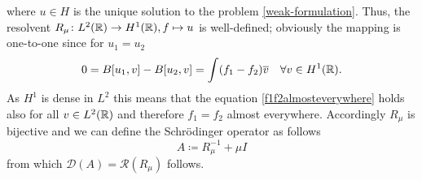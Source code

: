 where $u \in H$ is the unique solution to the problem \eqref{weak-formulation}. Thus, the resolvent $R_{\mu} \colon L^{2}(\mathbb{R}) \rightarrow H^{1}(\mathbb{R}), f \mapsto u$ is well-defined; obviously the mapping is one-to-one since for $u_{1} = u_{2}$
	\begin{equation}
		0 = B[u_{1}, v] - B[u_{2}, v]= \int (f_{1} - f_{2}) \overline{v} \quad \forall v \in H^{1}(\mathbb{R}). \label{f1f2almosteverywhere}
	\end{equation} 
As $H^{1}$ is dense in $L^{2}$ this means that the equation \eqref{f1f2almosteverywhere} holds also for all $v \in L^{2}(\mathbb{R})$ and therefore $f_{1} = f_{2}$ almost everywhere. Accordingly $R_{\mu}$ is bijective and we can define the Schrödinger operator as follows
		\[ A \coloneqq R_{\mu}^{-1} + \mu I \]
from which $\mathcal{D}(A) = \mathcal{R}(R_{\mu})$ follows.
